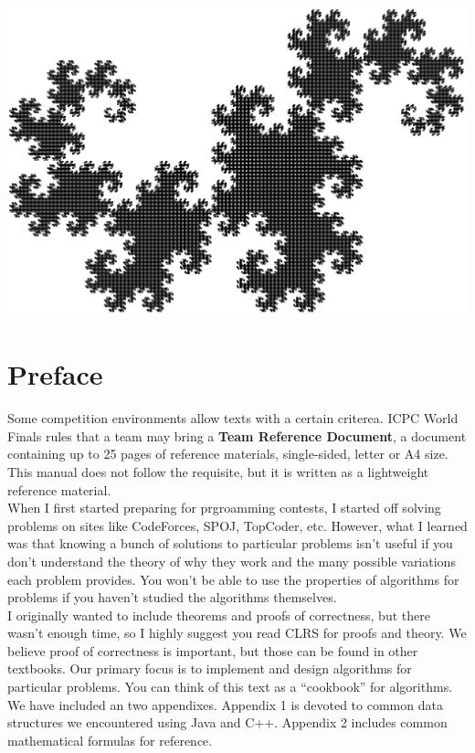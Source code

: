 \documentclass[]{book}
\author{}
\title{}
\date{}
\begin{document}
  \frontmatter
  \thispagestyle{empty}
  \begin{center}
    \includegraphics[scale=0.17]{dragon16.png}
  \end{center}
  \clearpage
  \tableofcontents
  \thispagestyle{empty}

  \chapter*{Preface}
    \indent Some competition environments allow texts with a certain criterea. ICPC World Finals
    rules that a team may bring a \textbf{Team Reference Document}, a document containing up to
    25 pages of reference materials, single-sided, letter or A4 size. This manual does not
    follow the requisite, but it is written as a lightweight reference material.\\
    \indent When I first started preparing for prgroamming contests, I started off solving
    problems on sites like CodeForces, SPOJ, TopCoder, etc. However, what I learned was
    that knowing a bunch of solutions to particular problems isn't useful if you don't understand
    the theory of why they work and the many possible variations each problem provides. You won't
    be able to use the properties of algorithms for problems if you haven't studied the algorithms
    themselves.\\
    \indent I originally wanted to include theorems and proofs of correctness, but there wasn't
    enough time, so I highly suggest you read CLRS for proofs and theory. We believe
    proof of correctness is important, but those can be found in other textbooks. Our primary focus
    is to implement and design algorithms for particular problems. You can think of this
    text as a ``cookbook'' for algorithms.\\
    \indent We have included an two appendixes. Appendix 1 is devoted to common data structures we
    encountered using Java and C++. Appendix 2 includes common mathematical formulas for reference.
    \restoregeometry  %
\end{document}
